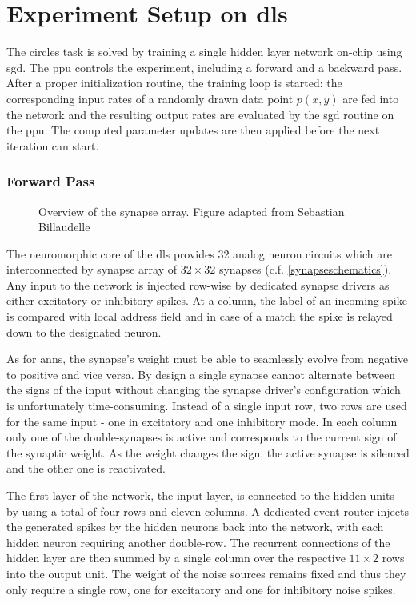 \section{Experiment Setup on \gls{dls}}
\label{circlesimplementation}
The circles task is solved by training a single hidden layer network on-chip using \acrlong{sgd}. The \gls{ppu} controls the experiment, including a forward and a backward pass. After a proper initialization routine, the training loop is started: the corresponding input rates of a randomly drawn data point $p(x,y)$ are fed into the network and the resulting output rates are evaluated by the \gls{sgd} routine on the \gls{ppu}. The computed parameter updates are then applied before the next iteration can start.

\subsubsection*{Forward Pass}

\begin{wrapfigure}{R}{0.35\textwidth}
	\centering
	
	\caption[Overview of the synapse array.]{Overview of the synapse array. Figure adapted from Sebastian Billaudelle} 
	\label{synapsearraysketch}
\end{wrapfigure}
The neuromorphic core of the \gls{dls} provides 32 analog neuron circuits which are interconnected by synapse array of $32 \times 32$ synapses (c.f. \cref{synapseschematics}). Any input to the network is injected row-wise by dedicated synapse drivers as either excitatory or inhibitory spikes. At a column, the label of an incoming spike is compared with local address field and in case of a match the spike is relayed down to the designated neuron.

As for \glspl{ann}, the synapse's weight must be able to seamlessly evolve from negative to positive and vice versa. By design a single synapse cannot alternate between the signs of the input without changing the synapse driver's configuration which is unfortunately time-consuming. Instead of a single input row, two rows are used for the same input - one in excitatory and one inhibitory mode. In each column only one of the double-synapses is active and corresponds to the current sign of the synaptic weight. As the weight changes the sign, the active synapse is silenced and the other one is reactivated. 

The first layer of the network, the input layer, is connected to the hidden units by using a total of four rows and eleven columns. A dedicated event router injects the generated spikes by the hidden neurons back into the network, with each hidden neuron requiring another double-row. The recurrent connections of the hidden layer are then summed by a single column over the respective $11 \times 2$ rows into the output unit. The weight of the noise sources remains fixed and thus they only require a single row, one for excitatory and one for inhibitory noise spikes.

